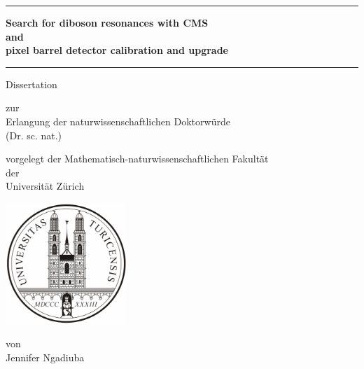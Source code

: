 

\begin{center}

  \thispagestyle{empty}
  {\parindent0cm
   \rule{\linewidth}{.7ex}}
  \begin{center}

    \bfseries\LARGE
    Search for diboson resonances with CMS\\ 
    and\\ 
    pixel barrel detector 
    calibration and upgrade
  \end{center}
  \rule{\linewidth}{.7ex}

\par
\vspace{0.4 in}

{\LARGE Dissertation}
\vspace{0.1in}

zur \\
Erlangung der 
naturwissenschaftlichen Doktorw\"urde \\
(Dr. sc. nat.) \\
\par
\vspace{0.1in}


vorgelegt der Mathematisch-naturwissenschaftlichen Fakult\"at \\
der \\
\vspace{0.05in}
{\LARGE Universit\"at Z\"urich}
\par
\vspace{0.3in}

\includegraphics[width=1.8in]{zurich_logo}

\vspace{0.3in}
von \\
\vspace{0.05in}
{\LARGE Jennifer Ngadiuba} \\
\par
\vspace{0.4in}



\end{center}
